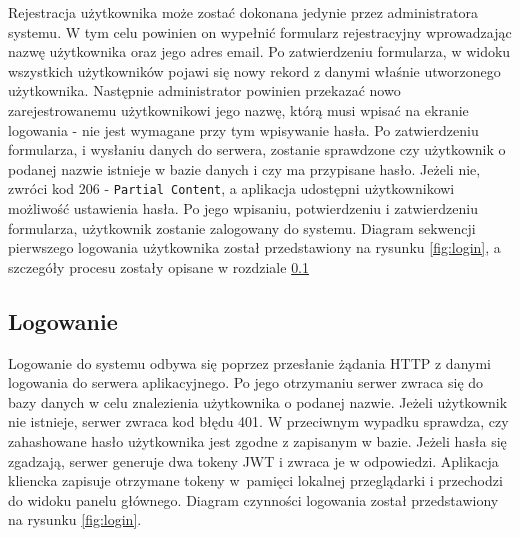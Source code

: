 Rejestracja użytkownika może zostać dokonana jedynie przez administratora systemu. W tym celu powinien on wypełnić formularz rejestracyjny wprowadzając nazwę użytkownika oraz jego adres email. Po zatwierdzeniu formularza, w widoku wszystkich użytkowników pojawi się nowy rekord z danymi właśnie utworzonego użytkownika. Następnie administrator powinien przekazać nowo zarejestrowanemu użytkownikowi jego nazwę, którą musi wpisać na ekranie logowania - nie jest wymagane przy tym wpisywanie hasła. Po zatwierdzeniu formularza, i wysłaniu danych do serwera, zostanie sprawdzone czy użytkownik o podanej nazwie istnieje w bazie danych i czy ma przypisane hasło. Jeżeli nie, zwróci kod 206 - \texttt{Partial Content}, a aplikacja udostępni użytkownikowi możliwość ustawienia hasła. Po jego wpisaniu, potwierdzeniu i zatwierdzeniu formularza, użytkownik zostanie zalogowany do systemu. Diagram sekwencji pierwszego logowania użytkownika został przedstawiony na rysunku \ref{fig:login}, a szczegóły procesu zostały opisane w rozdziale \ref{ss:logowanie}

\subsection{Logowanie}
\label{ss:logowanie}

Logowanie do systemu odbywa się poprzez przesłanie żądania HTTP z danymi logowania do serwera aplikacyjnego. Po jego otrzymaniu serwer zwraca się do bazy danych w celu znalezienia użytkownika o podanej nazwie. Jeżeli użytkownik nie istnieje, serwer zwraca kod błędu 401. W przeciwnym wypadku sprawdza, czy zahashowane hasło użytkownika jest zgodne z zapisanym w bazie. Jeżeli hasła się zgadzają, serwer generuje dwa tokeny JWT i zwraca je w odpowiedzi. Aplikacja kliencka zapisuje otrzymane tokeny w~pamięci lokalnej przeglądarki i przechodzi do widoku panelu głównego. Diagram czynności logowania został przedstawiony na rysunku \ref{fig:login}.

